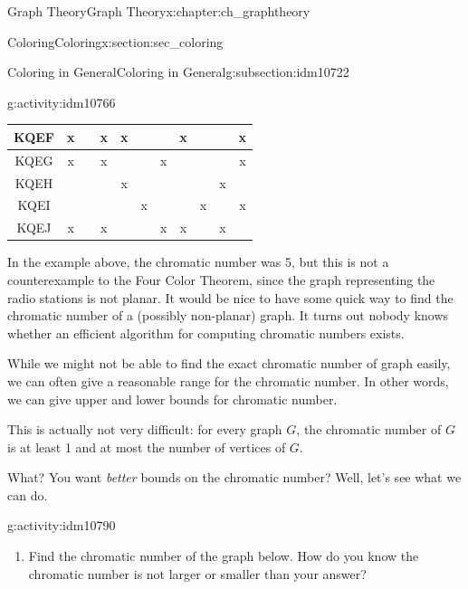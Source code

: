 \documentclass[oneside,10pt,]{book}
\numberwithin{equation}{chapter}
\begin{document}
\begin{chapterptx}{Graph Theory}{}{Graph Theory}{}{}{x:chapter:ch_graphtheory}
\begin{sectionptx}{Coloring}{}{Coloring}{}{}{x:section:sec_coloring}
\begin{subsectionptx}{Coloring in General}{}{Coloring in General}{}{}{g:subsection:idm10722}
\begin{activity}{}{g:activity:idm10766}
\begin{sidebyside}{1}{0}{0}{0}
\begin{sbspanel}{1}
{\begin{tabular}{c|c|c|c|c|c|c|c|c|c|c|}
{\tiny KQEF }&  x   &      &  x   &  x   &      &      &   x  &      &      &  x   \\ \hline
{\tiny KQEG }&  x   &      &  x   &      &      &  x   &      &      &      &  x   \\ \hline
{\tiny KQEH }&      &      &      &  x   &      &      &      &      &  x   &      \\ \hline
{\tiny KQEI }&      &      &      &      &  x   &      &      &  x   &      &  x   \\ \hline
{\tiny KQEJ }&  x   &      &  x   &      &      &  x   &   x  &      &  x   &      \\ \hline
\end{tabular}
}%
\end{sbspanel}%
\end{sidebyside}%
\end{activity}
In the example above, the chromatic number was 5, but this is not a counterexample to the Four Color Theorem, since the graph representing the radio stations is not planar. It would be nice to have some quick way to find the chromatic number of a (possibly non-planar) graph. It turns out nobody knows whether an efficient algorithm for computing chromatic numbers exists.%
\par
While we might not be able to find the exact chromatic number of graph easily, we can often give a reasonable range for the chromatic number. In other words, we can give upper and lower bounds for chromatic number.%
\par
This is actually not very difficult: for every graph \(G\), the chromatic number of \(G\) is at least 1 and at most the number of vertices of \(G\).%
\par
What? You want \emph{better} bounds on the chromatic number? Well, let's see what we can do.%
\begin{activity}{}{g:activity:idm10790}%
\begin{enumerate}[font=\bfseries,label=(\alph*),ref=\alph*]
\item{}Find the chromatic number of the graph below.  How do you know the chromatic number is not larger or smaller than your answer?%
\begin{sidebyside}{1}{0.375}{0.375}{0}%
\begin{sbspanel}{0.25}%
\end{sbspanel}
\end{sidebyside}
\end{enumerate}
\end{activity}
\end{subsectionptx}
\end{sectionptx}
\end{chapterptx}
\end{document}
